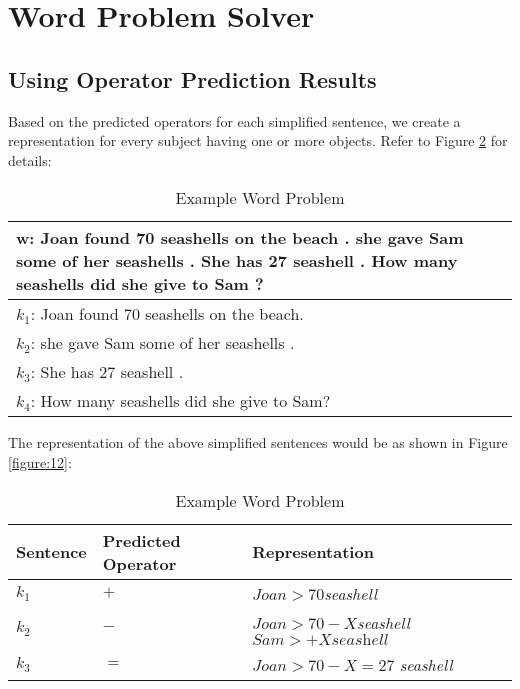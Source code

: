 \documentclass[11pt]{article}
\begin{document}
\section{Word Problem Solver}
\subsection{Using Operator Prediction Results}
Based on the predicted operators for each simplified sentence, we create a representation for every subject having one or more objects. Refer to Figure \ref{figure:11} for details:

\begin{table}[h!]
\centering
\begin{tabular}{ | m{7cm} | }
\hline
 $\mathbf{w}$\textbf{: Joan found 70 seashells on the beach . she gave Sam some of her seashells . She has 27 seashell . How many seashells did she give to Sam ?}\\
\hline
$\mathit{k_{1}}$: Joan found 70 seashells on the beach.\\
\hline
$\mathit{k_{2}}$: she gave Sam some of her seashells .\\
\hline
$\mathit{k_{3}}$: She has 27 seashell .\\
\hline
$\mathit{k_{4}}$: How many seashells did she give to Sam?\\
\hline
\end{tabular}
\caption{Example Word Problem}
\label{figure:11}
\end{table}

The representation of the above simplified sentences would be as shown in Figure \ref{figure:12}:
\begin{table}[h!]
\centering
\begin{tabular}{ |p{1.3cm}|p{1.7cm}|p{3.7cm}| }
\hline
\textbf{Sentence} & \textbf{Predicted Operator} & \textbf{Representation} \\ \hline
$\mathit{k_{1}}$ & $\mathit{+}$ & $\mathit{Joan > 70}$\textit{seashell} \\ \hline
$\mathit{k_{2}}$ & $\mathit{-}$ & $\mathit{Joan> 70 - X}$\textit{seashell} $\mathit{Sam > +X}\textit{seashell}$ \\ \hline
$\mathit{k_{3}}$ & $\mathit{=}$ & $\mathit{Joan > 70 - X = 27}$ \textit{seashell}\\ \hline
\end{tabular}
\caption{Example Word Problem}
\label{figure:11}
\end{table}
\end{document}
